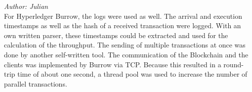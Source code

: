 \textit{Author: Julian} \\
For Hyperledger Burrow, the logs were used as well. The arrival and execution timestamps as well as the hash of a 
received transaction were logged. With an own written parser, these timestamps could be extracted and used for the calculation
of the throughput. The sending of multiple transactions at once was done by another self-written tool. The communication of the
Blockchain and the clients was implemented by Burrow via TCP. Because this resulted in a round-trip time of about one second, a thread pool
was used to increase the number of parallel transactions. 